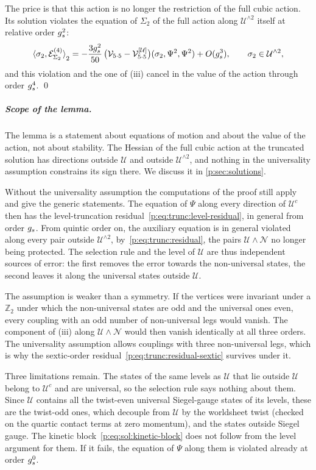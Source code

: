 The price is that this action is no longer the restriction of the full cubic action.
Its solution violates the equation of $\Sigma_2$ of the full action along $\mathcal U^{\wedge 2}$ itself at relative order $\gs^2$:
\begin{equation}
\label{p:eq:trunc:residual-inner}
\pair[2]{\sigma_2}{\mathcal E^{(4)}_{\Sigma_2}}
  = - \frac{3 \gs^2}{50} \, \big( \vertex{5 \cdot 5} - \vertex{5 \cdot 5}^{[\mathcal U]} \big)(\sigma_2, \Psi^2, \Psi^2)
    + O(\gs^3),
\qquad
\sigma_2 \in \mathcal U^{\wedge 2},
\end{equation}
and this violation and the one of (iii) cancel in the value of the action through order $\gs^4$.
\qed

\subparagraph{Scope of the lemma.}

The lemma is a statement about equations of motion and about the value of the action, not about stability.
The Hessian of the full cubic action at the truncated solution has directions outside $\mathcal U$ and outside $\mathcal U^{\wedge 2}$, and nothing in the universality assumption constrains its sign there.
We discuss it in \cref{p:sec:solutions}.

Without the universality assumption the computations of the proof still apply and give the generic statements.
The equation of $\Psi$ along every direction of $\mathcal U^c$ then has the level-truncation residual~\eqref{p:eq:trunc:level-residual}, in general from order $\gs$.
From quintic order on, the auxiliary equation is in general violated along every pair outside $\mathcal U^{\wedge 2}$, by~\eqref{p:eq:trunc:residual}, the pairs $\mathcal U \wedge \mathcal N$ no longer being protected.
The selection rule and the level of $\mathcal U$ are thus independent sources of error: the first removes the error towards the non-universal states, the second leaves it along the universal states outside $\mathcal U$.

The assumption is weaker than a symmetry.
If the vertices were invariant under a $\mathbb Z_2$ under which the non-universal states are odd and the universal ones even, every coupling with an odd number of non-universal legs would vanish.
The component of (iii) along $\mathcal U \wedge \mathcal N$ would then vanish identically at all three orders.
The universality assumption allows couplings with three non-universal legs, which is why the sextic-order residual~\eqref{p:eq:trunc:residual-sextic} survives under it.

Three limitations remain.
The states of the same levels as $\mathcal U$ that lie outside $\mathcal U$ belong to $\mathcal U^c$ and are universal, so the selection rule says nothing about them.
Since $\mathcal U$ contains all the twist-even universal Siegel-gauge states of its levels, these are the twist-odd ones, which decouple from $\mathcal U$ by the worldsheet twist (checked on the quartic contact terms at zero momentum), and the states outside Siegel gauge.
The kinetic block~\eqref{p:eq:sol:kinetic-block} does not follow from the level argument for them.
  If it fails, the equation of $\Psi$ along them is violated already at order $\gs^0$.

